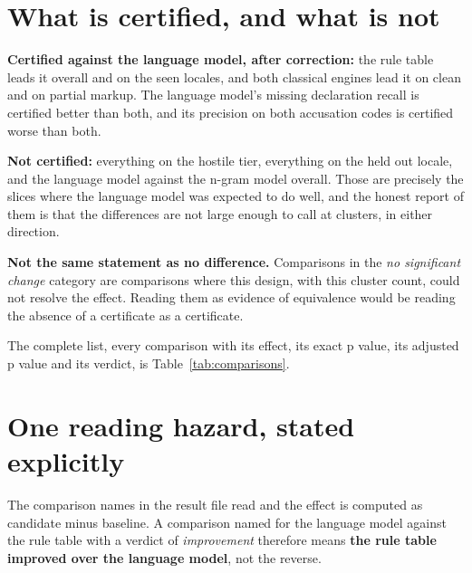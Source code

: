 \section{What is certified, and what is not}

\begin{table}[htbp]
  \centering
  \caption{All comparisons in the family, read in the direction they were
  measured. The full table is Table~\ref{tab:comparisons} in
  Appendix~\ref{app:tables}; this one repeats its shape for reference.}
  \label{tab:cross-check}
  
\end{table}

\textbf{Certified against the language model, after correction:} the rule table
leads it overall and on the seen locales, and both classical engines lead it on
clean and on partial markup. The language model's missing declaration recall is
certified better than both, and its precision on both accusation codes is
certified worse than both.

\textbf{Not certified:} everything on the hostile tier, everything on the held
out locale, and the language model against the n-gram model overall. Those are
precisely the slices where the language model was expected to do well, and the
honest report of them is that the differences are not large enough to call at
\vClusters{} clusters, in either direction.

\textbf{Not the same statement as no difference.} Comparisons in the \emph{no
significant change} category are comparisons where this design, with this cluster
count, could not resolve the effect. Reading them as evidence of equivalence
would be reading the absence of a certificate as a certificate.

The complete list, every comparison with its effect, its exact p value, its
adjusted p value and its verdict, is Table~\ref{tab:comparisons}.

\section{One reading hazard, stated explicitly}

The comparison names in the result file read  and
the effect is computed as candidate minus baseline. A comparison named for the
language model against the rule table with a verdict of \emph{improvement}
therefore means \textbf{the rule table improved over the language model}, not the
reverse.

